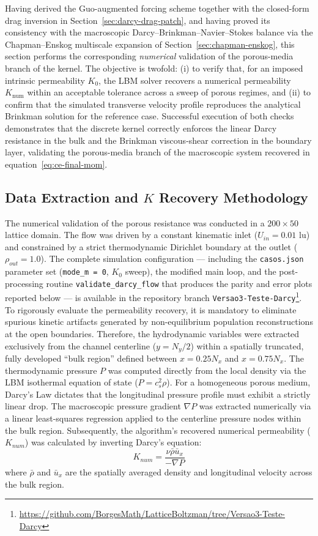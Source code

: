 Having derived the Guo-augmented forcing scheme together with the closed-form drag inversion in Section~\ref{sec:darcy-drag-patch}, and having proved its consistency with the macroscopic Darcy--Brinkman--Navier--Stokes balance via the Chapman--Enskog multiscale expansion of Section~\ref{sec:chapman-enskog}, this section performs the corresponding \emph{numerical} validation of the porous-media branch of the kernel.
The objective is twofold: (i) to verify that, for an imposed intrinsic permeability $K_0$, the LBM solver recovers a numerical permeability $K_{\mathrm{num}}$ within an acceptable tolerance across a sweep of porous regimes, and (ii) to confirm that the simulated transverse velocity profile reproduces the analytical Brinkman solution for the reference case.
Successful execution of both checks demonstrates that the discrete kernel correctly enforces the linear Darcy resistance in the bulk and the Brinkman viscous-shear correction in the boundary layer, validating the porous-media branch of the macroscopic system recovered in equation~\eqref{eq:ce-final-mom}.

\subsection{Data Extraction and $K$ Recovery Methodology}
The numerical validation of the porous resistance was conducted in a $200 \times 50$ lattice domain.
The flow was driven by a constant kinematic inlet ($U_{in} = 0.01$ lu) and constrained by a strict thermodynamic Dirichlet boundary at the outlet ($\rho_{out} = 1.0$).
The complete simulation configuration --- including the \texttt{casos.json} parameter set (\texttt{mode\_m = 0}, $K_0$ sweep), the modified main loop, and the post-processing routine \texttt{validate\_darcy\_flow} that produces the parity and error plots reported below --- is available in the repository branch \texttt{Versao3-Teste-Darcy}\footnote{\url{https://github.com/BorgesMath/LatticeBoltzman/tree/Versao3-Teste-Darcy}}.
To rigorously evaluate the permeability recovery, it is mandatory to eliminate spurious kinetic artifacts generated by non-equilibrium population reconstructions at the open boundaries.
Therefore, the hydrodynamic variables were extracted exclusively from the channel centerline ($y = N_y/2$) within a spatially truncated, fully developed ``bulk region'' defined between $x = 0.25N_x$ and $x = 0.75N_x$.
The thermodynamic pressure $P$ was computed directly from the local density via the LBM isothermal equation of state ($P = c_s^2 \rho$).
For a homogeneous porous medium, Darcy's Law dictates that the longitudinal pressure profile must exhibit a strictly linear drop.
The macroscopic pressure gradient $\nabla P$ was extracted numerically via a linear least-squares regression applied to the centerline pressure nodes within the bulk region.
Subsequently, the algorithm's recovered numerical permeability ($K_{num}$) was calculated by inverting Darcy's equation:
\begin{equation}
    K_{num} = \frac{\nu \bar{\rho} \bar{u}_x}{-\nabla P}
\end{equation}
where $\bar{\rho}$ and $\bar{u}_x$ are the spatially averaged density and longitudinal velocity across the bulk region.

